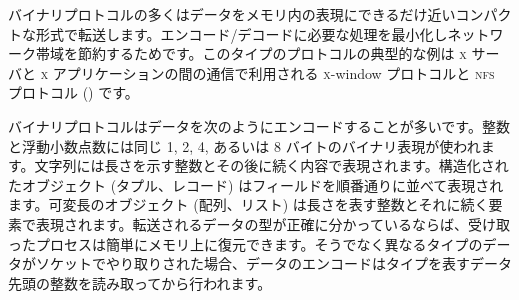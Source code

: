 バイナリプロトコルの多くはデータをメモリ内の表現にできるだけ近いコンパクトな形式で転送します。エンコード/デコードに必要な処理を最小化しネットワーク帯域を節約するためです。このタイプのプロトコルの典型的な例は \textsc{x} サーバと \textsc{x} アプリケーションの間の通信で利用される \textsc{x}-window プロトコルと \textsc{nfs} プロトコル () です。

バイナリプロトコルはデータを次のようにエンコードすることが多いです。整数と浮動小数点数には同じ 1, 2, 4, あるいは 8 バイトのバイナリ表現が使われます。文字列には長さを示す整数とその後に続く内容で表現されます。構造化されたオブジェクト (タプル、レコード) はフィールドを順番通りに並べて表現されます。可変長のオブジェクト (配列、リスト) は長さを表す整数とそれに続く要素で表現されます。転送されるデータの型が正確に分かっているならば、受け取ったプロセスは簡単にメモリ上に復元できます。そうでなく異なるタイプのデータがソケットでやり取りされた場合、データのエンコードはタイプを表すデータ先頭の整数を読み取ってから行われます。

